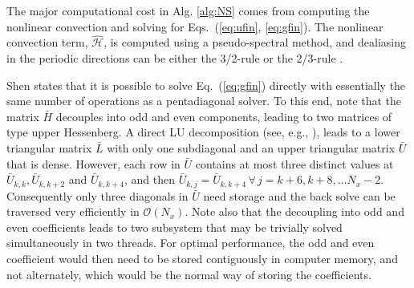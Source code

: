 \documentclass[preprint]{elsarticle}
\newcommand{\D}[1]{\bar{#1}}
\begin{document}
The major computational cost in Alg. \ref{alg:NS} comes from  computing the 
nonlinear convection and solving for Eqs.~(\ref{eq:ufin}, \ref{eq:gfin}). The 
nonlinear convection term, $\bm{\hat{\mathcal{H}}}$, is computed using a 
pseudo-spectral method, and dealiasing in the periodic directions can be either 
the 3/2-rule \cite{canuto1988} or the 2/3-rule \cite{Orzag71}.  

Shen \cite{Shen95} states that it is possible to solve Eq.~(\ref{eq:gfin}) directly 
with essentially the same number of operations as a pentadiagonal solver. To this end, note that the matrix 
$\D{H}$ decouples into odd and even components, leading to two matrices of type upper Hessenberg. A direct LU decomposition (see, e.g., \cite{stewart98}), leads to a lower triangular  
matrix $\D{L}$ with only one subdiagonal and an upper triangular matrix $\D{U}$ that is dense. However, each row in $\D{U}$ 
contains at most three distinct values at $\D{U}_{k,k}, \D{U}_{k,k+2}$ and $\D{U}_{k,k+4}$, 
and then $\D{U}_{k,j} = \D{U}_{k,k+4}\, \forall \, j = k+6, k+8, \ldots N_x-2$. 
Consequently 
only three diagonals in $\D{U}$ need storage and the back solve can be traversed 
very efficiently in $\mathcal{O}(N_x)$. Note also that the decoupling into 
odd and even coefficients leads to two subsystem that may be trivially 
solved simultaneously in two threads. For optimal 
performance, the odd and even coefficient would then need to be stored 
contiguously in computer memory, and not alternately, which would be the normal way of storing the coefficients.

\end{document}
